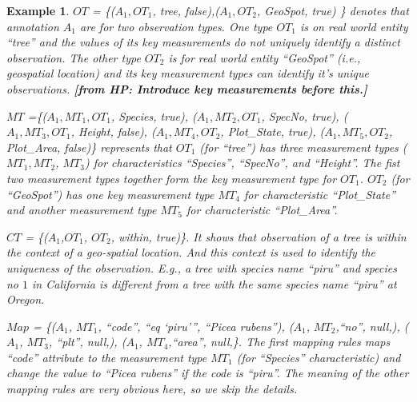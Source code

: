 \documentclass[conference]{IEEEtran}
\newtheorem{example}{Example}[section]
\newcommand{\from}[2]{{\bf[{\sc from #1:} #2]}}
\begin{document}
\begin{example}
$OT$ = \{($A_1, OT_1$, tree, false),($A_1, OT_2$, GeoSpot, true) \}
  denotes that annotation $A_1$ are for two observation types. One
  type $OT_1$ is on real world entity ``tree'' and the values of its key measurements
  do not uniquely identify a distinct observation. The other type
  $OT_2$ is for real world entity ``GeoSpot'' (i.e., geospatial
  location) and its key measurement types can identify it's unique
  observations. \from{HP}{Introduce key measurements before this.}

$MT$ =\{($A_1, MT_1, OT_1$, Species, true), 
($A_1, MT_2, OT_1$, SpecNo, true), 
($A_1, MT_3, OT_1$, Height, false),
($A_1, MT_4, OT_2$, Plot\_State, true), 
($A_1, MT_5, OT_2$, Plot\_Area, false)\} represents that $OT_1$
(for ``tree'') has three measurement types ($MT_1, MT_2$, $MT_3$) for characteristics
``Species'', ``SpecNo'', and ``Height''. The fist two measurement
  types together form the key measurement type for $OT_1$. 
$OT_2$ (for ``GeoSpot'') has one key measurement type $MT_4$ for
  characteristic ``Plot\_State'' and another measurement type $MT_5$
  for characteristic ``Plot\_Area''. 

$CT$ = \{($A_1$,$OT_1$, $OT_2$, within, true)\}. It shows that
observation of a {\em tree} is within the context of a geo-spatial
location. And this context is used to identify the uniqueness of the
observation. E.g., a tree with species name ``piru'' and species no
$1$ in California
is different from a tree with 
the same species name ``piru'' at Oregon. 


$Map$ = \{($A_1$, $MT_1$, ``code'', ``eq `piru''', ``Picea rubens''),
($A_1$, $MT_2$,``no'', null,), 
($A_1$, $MT_3$, ``plt'', null,), 
($A_1$, $MT_4$,``area'', null,\}. 
The first mapping rules maps ``code''
attribute to the measurement type $MT_1$ (for ``Species''
characteristic) and change the value to ``Picea rubens'' if the code
is ``piru''. The meaning of the other mapping rules are very
obvious here, so we skip the details. 
\end{example}
\end{document}
